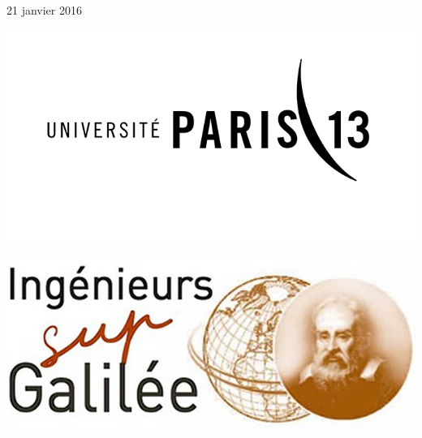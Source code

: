 \begin{titlepage}
\begin{center}
		\vfill			
		{\large 21 janvier 2016}
		\vfill
		\begin{minipage}{0.35\textwidth}
			\begin{flushleft}
				\includegraphics[width=1\textwidth]{../img/UP13.png}			
			\end{flushleft}
		\end{minipage}
		\hfill
		\begin{minipage}{0.35\textwidth}
			\begin{flushright}
				\includegraphics[width=1\textwidth]{../img/sup-galile.png}
			\end{flushright}
		\end{minipage}
		
									
	\end{center}		
\end{titlepage}